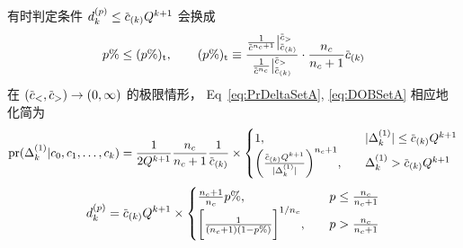 有时判定条件 $\dmsdkp\le\dmscbar_{(k)}Q^{k+1}$ 会换成
\begin{equation}
  p\%\le(p\%)_{\textrm{t}},
  \qquad (p\%)_{\textrm{t}}\equiv
  \frac{\frac{1}{\dmscbar^{n_c+1}}\dmsvat{\dmscbar_{(k)}}{\dmscbar_>}}{
    \frac{1}{\dmscbar^{n_c}}\dmsvat{\dmscbar_{(k)}}{\dmscbar_>}}
  \cdot \frac{n_c}{n_c+1}\dmscbar_{(k)}
\end{equation}
在 $(\dmscbar_<,\dmscbar_>)\to(0,\infty)$ 的极限情形，
Eq~\eqref{eq:PrDeltaSetA}, \eqref{eq:DOBSetA} 相应地化简为
\begin{equation}
  \dmspr(\dmsdeltako|\dmsccck)= \frac{1}{2Q^{k+1}} \frac{n_c}{n_c+1}
  \frac{1}{\dmscbar_{(k)}}\times
  \begin{cases}
    1,&\quad |\dmsdeltako|\le\dmscbar_{(k)}Q^{k+1}\\
    \biggl( \frac{\dmscbar_{(k)}Q^{k+1}}{|\dmsdeltako|}\biggr)^{n_c+1},
    &\quad \dmsdeltako > \dmscbar_{(k)}Q^{k+1}
  \end{cases}
\end{equation}
\begin{equation}
  \dmsdkp = \dmscbar_{(k)}Q^{k+1}\times
  \begin{cases}
    \frac{n_c+1}{n_c}p\%,
    &\quad p\le \frac{n_c}{n_c+1}\\
    \biggl[ \frac{1}{(n_c+1)(1-p\%)}\biggr]^{1/n_c},
    &\quad p > \frac{n_c}{n_c+1}
  \end{cases}
\end{equation}

